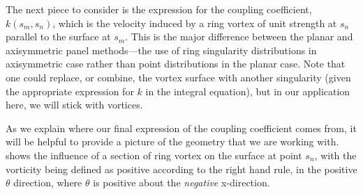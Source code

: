 %
%
%
%
%
%
%
%
%


The next piece to consider is the expression for the coupling coefficient, \(k(s_m,s_n)\), which is the velocity induced by a ring vortex of unit strength at \(s_n\) parallel to the surface at \(s_m\).
This is the major difference between the planar and axisymmetric panel methods---the use of ring singularity distributions in axisymmetric case rather than point distributions in the planar case.
Note that one could replace, or combine, the vortex surface with another singularity (given the appropriate expression for \(k\) in the integral equation), but in our application here, we will stick with vortices.

As we explain where our final expression of the coupling coefficient comes from, it will be helpful to provide a picture of the geometry that we are working with.
 shows the influence of a section of ring vortex on the surface at point \(s_n\), with the vorticity being defined as positive according to the right hand rule, in the positive \(\theta\) direction, where \(\theta\) is positive about the \textit{negative} x-direction.

